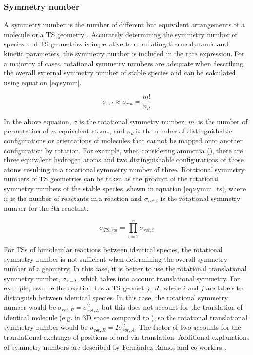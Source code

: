 \documentclass[preprint, 11pt]{elsarticle} %
\begin{document}
\subsubsection{Symmetry number}

A symmetry number is the number of different but equivalent arrangements of a molecule or a TS geometry \cite{FernandezRamos:2007}.
Accurately determining the symmetry number of species and TS geometries is imperative to calculating thermodynamic and kinetic parameters, the symmetry number is included in the rate expression.
For a majority of cases, rotational symmetry numbers are adequate when describing the overall external symmetry number of stable species and can be calculated using equation \ref{eq:symm}.

\begin{equation}
    \label{eq:symm}
    \sigma_{ext} \approx \sigma_{rot} = \frac{m!}{n_d}
\end{equation}

In the above equation, $\sigma$ is the rotational symmetry number, $m!$ is the number of permutation of $m$ equivalent atoms, and $n_d$ is the number of distinguishable configurations or orientations of molecules that cannot be mapped onto another configuration by rotation.
For example, when considering ammonia (), there are three equivalent hydrogen atoms and two distinguishable configurations of those atoms resulting in a rotational symmetry number of three.
Rotational symmetry numbers of TS geometries can be taken as the product of the rotational symmetry numbers of the stable species, shown in equation \ref{eq:symm_ts}, where $n$ is the number of reactants in a reaction and $\sigma_{rot,i}$ is the rotational symmetry number for the $i$th reactant.

\begin{equation}
    \sigma_{TS,rot} = \prod^n_{i=1}\sigma_{rot,i}
    \label{eq:symm_ts}
\end{equation}

For TSs of bimolecular reactions between identical species, the rotational symmetry number is not sufficient when determining the overall symmetry number of a geometry.
In this case, it is better to use the rotational translational symmetry number, $\sigma_{r-t}$, which takes into account translational symmetry.
For example, assume the reaction  has a TS geometry, $R$, where $i$ and $j$ are labels to distinguish between identical  species.
In this case, the rotational symmetry number would be $\sigma_{rot,R} = \sigma_{rot,A}^2$ but this does not account for the translation of identical molecule (e.g.  in 3D space compared to ), so the rotational translational symmetry number would be $\sigma_{rot,R} = 2\sigma_{rot,A}^2$. 
The factor of two accounts for the translational exchange of positions of  and  via translation.
Additional explanations of symmetry numbers are described by Fern\'andez-Ramos and co-workers \cite{FernandezRamos:2007}.
\end{document}
